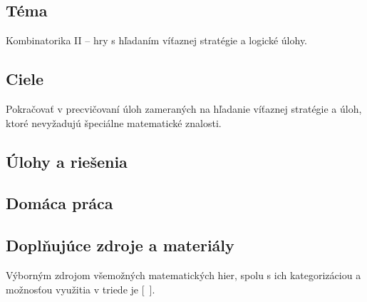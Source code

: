 
\subsection*{Téma}
Kombinatorika II -- hry s hľadaním víťaznej stratégie a logické úlohy.
\subsection*{Ciele}
Pokračovať v precvičovaní úloh zameraných na hľadanie víťaznej stratégie a úloh, ktoré nevyžadujú špeciálne matematické znalosti.

\subsection*{Úlohy a riešenia}













\subsection*{Domáca práca}







\subsection*{Doplňujúce zdroje a materiály}
Výborným zdrojom všemožných matematických hier, spolu s ich kategorizáciou a možnosťou využitia v triede je  [~\cite{burjan1999}].

